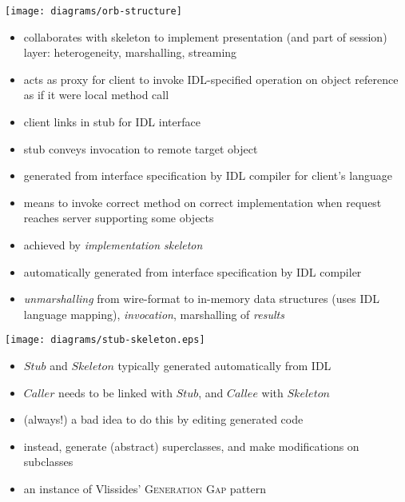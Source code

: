 \documentclass{sepslide-soa-faked} %
\begin{document}
\begin{slide}
  \texttt{[image: diagrams/orb-structure]}
\end{slide}

\begin{slide}
\begin{itemize}
\item collaborates with skeleton to implement presentation (and part of session) layer: heterogeneity, marshalling, streaming
\item acts as proxy for client to invoke IDL-specified operation on object reference as if it were local method call
\item client links in stub for IDL interface
\item stub conveys invocation to remote target object
\item generated from interface specification
   by IDL compiler for client's language
\end{itemize}
\end{slide}

\begin{slide}
\begin{itemize}
\item means to invoke correct method on correct implementation
  when request reaches server supporting some objects
\item achieved by \emph{implementation skeleton}
\item automatically generated from interface specification by IDL compiler
\item \emph{unmarshalling} from wire-format to in-memory data structures
  (uses IDL language mapping), \emph{invocation}, marshalling of \emph{results}
\end{itemize}
\end{slide}

\begin{slide}
  \texttt{[image: diagrams/stub-skeleton.eps]}
\end{slide}

\begin{slide}
  \begin{itemize}
  \item $Stub$ and $Skeleton$ typically generated automatically from IDL
  \item $Caller$ needs to be linked with $Stub$, and $Callee$ with $Skeleton$
  \item (always!) a bad idea to do this by editing generated code
  \item instead, generate (abstract) superclasses, and make modifications on subclasses
  \item an instance of Vlissides' \textsc{Generation Gap} pattern
  \end{itemize}
\end{slide}
\end{document}
